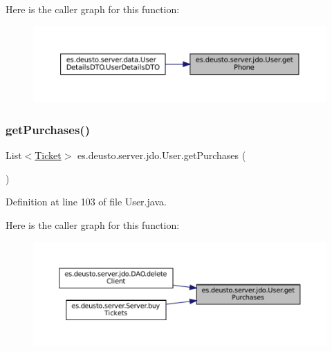 Here is the caller graph for this function\+:
\nopagebreak
\begin{figure}[H]
\begin{center}
\leavevmode
\includegraphics[width=350pt]{classes_1_1deusto_1_1server_1_1jdo_1_1_user_a9ad4609fbf59521908115b9c49d903f4_icgraph}
\end{center}
\end{figure}
\mbox{\label{classes_1_1deusto_1_1server_1_1jdo_1_1_user_a320e5da31fb294ff638ff77b0c4f6de4}} 
\subsubsection{\texorpdfstring{getPurchases()}{getPurchases()}}
{\footnotesize\ttfamily List$<$\mbox{\hyperlink{classes_1_1deusto_1_1server_1_1jdo_1_1_ticket}{Ticket}}$>$ es.\+deusto.\+server.\+jdo.\+User.\+get\+Purchases (\begin{DoxyParamCaption}{ }\end{DoxyParamCaption})}



Definition at line 103 of file User.\+java.

Here is the caller graph for this function\+:
\nopagebreak
\begin{figure}[H]
\begin{center}
\leavevmode
\includegraphics[width=350pt]{classes_1_1deusto_1_1server_1_1jdo_1_1_user_a320e5da31fb294ff638ff77b0c4f6de4_icgraph}
\end{center}
\end{figure}
\mbox{\label{classes_1_1deusto_1_1server_1_1jdo_1_1_user_adc7114247c7881e3f9e0fd14b7905f9a}} 

